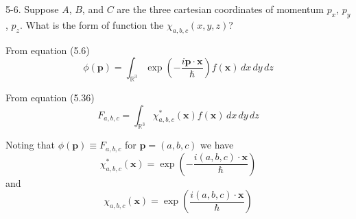 \documentclass[12pt]{article}
\newcommand\INT{\int_{\mathbb R^3}}
\begin{document}
5-6.
Suppose $A$, $B$, and $C$ are the three cartesian coordinates
of momentum $p_x$, $p_y$, $p_z$.
What is the form of function the $\chi_{a,b,c}(x,y,z)$?

\bigskip
From equation (5.6)
\begin{equation*}
\phi(\mathbf p)=\INT\exp\left(-\frac{i\mathbf p\cdot\mathbf x}{\hbar}\right)f(\mathbf x)\,dx\,dy\,dz
\end{equation*}

From equation (5.36)
\begin{equation*}
F_{a,b,c}=\INT\chi_{a,b,c}^*(\mathbf x)f(\mathbf x)\,dx\,dy\,dz
\end{equation*}

Noting that $\phi(\mathbf p)\equiv F_{a,b,c}$ for $\mathbf p=(a,b,c)$ we have
\begin{equation*}
\chi_{a,b,c}^*(\mathbf x)=\exp\left(-\frac{i(a,b,c)\cdot\mathbf x}{\hbar}\right)
\end{equation*}
and
\begin{equation*}
\chi_{a,b,c}(\mathbf x)=\exp\left(\frac{i(a,b,c)\cdot\mathbf x}{\hbar}\right)
\end{equation*}
\end{document}

